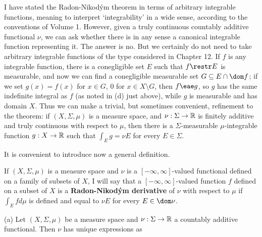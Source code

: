 { I have stated the Radon-Nikod\'ym theorem in
terms of arbitrary integrable functions, meaning to interpret
`integrability'
in a wide sense, according to the conventions of Volume 1.   However,
given a truly continuous countably additive functional $\nu$, we can ask
whether there is in any sense a canonical integrable function
representing it.   The answer is no.   But we certainly do not need to
take arbitrary integrable functions of the type considered in Chapter
12.   If $f$ is any integrable function, there is a conegligible set $E$
such that $f\restr E$ is measurable, and now we can find a
conegligible measurable set $G\subseteq E\cap\dom f$;  if we set
$g(x)=f(x)$ for $x\in G$, $0$ for $x\in X\setminus G$, then $f\eae g$,
so $g$ has the same indefinite integral as $f$ (as noted in (d) just
above), while $g$ is measurable and has domain $X$.   Thus we can make a
trivial, but sometimes convenient, refinement to the theorem:  if
$(X,\Sigma,\mu)$ is a measure space, and $\nu:\Sigma\to\Bbb R$ is
finitely additive and truly continuous with respect to $\mu$, then there
is a $\Sigma$-measurable $\mu$-integrable function $g:X\to\Bbb R$ such
that $\int_Eg=\nu E$ for every $E\in\Sigma$.

It is convenient to introduce now a general definition.} %
If $(X,\Sigma,\mu)$ is a measure space and $\nu$ is a
$[-\infty,\infty]$-valued
functional defined on a family of subsets of $X$, I will say that
a $[-\infty,\infty]$-valued function $f$ defined on a subset of $X$ is a
{\bf Radon-Nikod\'ym derivative} of $\nu$ with respect to $\mu$ if
$\int_Efd\mu$ is defined and
equal to $\nu E$ for
every $E\in\dom\nu$.   



 (a) Let $(X,\Sigma,\mu)$ be a measure
space and $\nu:\Sigma\to\Bbb R$ a countably additive functional.
Then $\nu$ has unique expressions as

